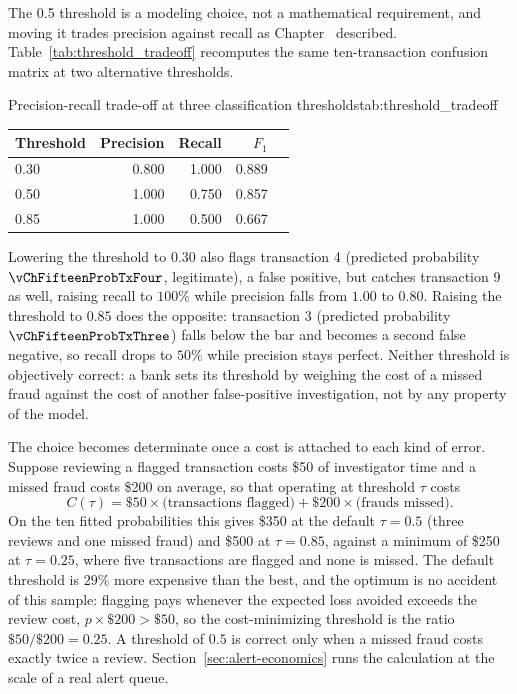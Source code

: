 \documentclass[../ai_in_finance]{subfiles}
\begin{document}
The 0.5 threshold is a modeling choice, not a mathematical requirement, and moving it trades precision against recall as Chapter~ described. Table~\ref{tab:threshold_tradeoff} recomputes the same ten-transaction confusion matrix at two alternative thresholds.

\begin{booktable}[htbp]{Precision-recall trade-off at three classification thresholds}{tab:threshold_tradeoff}
\begin{tabular}{lrrrr}
\toprule
Threshold & Precision & Recall & $F_1$ \\
\midrule
0.30 & 0.800 & 1.000 & 0.889 \\
0.50 & 1.000 & 0.750 & 0.857 \\
0.85 & 1.000 & 0.500 & 0.667 \\
\bottomrule
\end{tabular}
\end{booktable}

Lowering the threshold to $0.30$ also flags transaction 4 (predicted probability $\vChFifteenProbTxFour$, legitimate), a false positive, but catches transaction 9 as well, raising recall to $100\%$ while precision falls from $1.00$ to $0.80$. Raising the threshold to $0.85$ does the opposite: transaction 3 (predicted probability $\vChFifteenProbTxThree$) falls below the bar and becomes a second false negative, so recall drops to $50\%$ while precision stays perfect. Neither threshold is objectively correct: a bank sets its threshold by weighing the cost of a missed fraud against the cost of another false-positive investigation, not by any property of the model.

The choice becomes determinate once a cost is attached to each kind of error. Suppose reviewing a flagged transaction costs \$50 of investigator time and a missed fraud costs \$200 on average, so that operating at threshold $\tau$ costs
\begin{equation}
C(\tau) = \$50 \times \text{(transactions flagged)} + \$200 \times \text{(frauds missed)}.
\label{eq:fraud-threshold-cost}
\end{equation}
On the ten fitted probabilities this gives \$350 at the default $\tau = 0.5$ (three reviews and one missed fraud) and \$500 at $\tau = 0.85$, against a minimum of \$250 at $\tau = 0.25$, where five transactions are flagged and none is missed. The default threshold is $29\%$ more expensive than the best, and the optimum is no accident of this sample: flagging pays whenever the expected loss avoided exceeds the review cost, $p \times \$200 > \$50$, so the cost-minimizing threshold is the ratio $\$50/\$200 = 0.25$. A threshold of $0.5$ is correct only when a missed fraud costs exactly twice a review. Section~\ref{sec:alert-economics} runs the calculation at the scale of a real alert queue.
\end{document}
